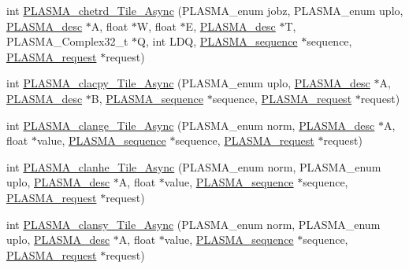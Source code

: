 \begin{DoxyCompactItemize}
\item 
int \hyperlink{group__PLASMA__Complex32__t__Tile__Async_ga4998a0da7c65a0bb81861994c7a3b1bd_ga4998a0da7c65a0bb81861994c7a3b1bd}{P\+L\+A\+S\+M\+A\+\_\+chetrd\+\_\+\+Tile\+\_\+\+Async} (P\+L\+A\+S\+M\+A\+\_\+enum jobz, P\+L\+A\+S\+M\+A\+\_\+enum uplo, \hyperlink{structplasma__desc__t}{P\+L\+A\+S\+M\+A\+\_\+desc} $\ast$A, float $\ast$W, float $\ast$E, \hyperlink{structplasma__desc__t}{P\+L\+A\+S\+M\+A\+\_\+desc} $\ast$T, P\+L\+A\+S\+M\+A\+\_\+\+Complex32\+\_\+t $\ast$Q, int L\+D\+Q, \hyperlink{structplasma__sequence__t}{P\+L\+A\+S\+M\+A\+\_\+sequence} $\ast$sequence, \hyperlink{structplasma__request__t}{P\+L\+A\+S\+M\+A\+\_\+request} $\ast$request)
\item 
int \hyperlink{group__PLASMA__Complex32__t__Tile__Async_ga88e2c85c4e64c2bcfaef5258f434d109_ga88e2c85c4e64c2bcfaef5258f434d109}{P\+L\+A\+S\+M\+A\+\_\+clacpy\+\_\+\+Tile\+\_\+\+Async} (P\+L\+A\+S\+M\+A\+\_\+enum uplo, \hyperlink{structplasma__desc__t}{P\+L\+A\+S\+M\+A\+\_\+desc} $\ast$A, \hyperlink{structplasma__desc__t}{P\+L\+A\+S\+M\+A\+\_\+desc} $\ast$B, \hyperlink{structplasma__sequence__t}{P\+L\+A\+S\+M\+A\+\_\+sequence} $\ast$sequence, \hyperlink{structplasma__request__t}{P\+L\+A\+S\+M\+A\+\_\+request} $\ast$request)
\item 
int \hyperlink{group__PLASMA__Complex32__t__Tile__Async_ga516fb49175da2a62925dd5f4e8570c6c_ga516fb49175da2a62925dd5f4e8570c6c}{P\+L\+A\+S\+M\+A\+\_\+clange\+\_\+\+Tile\+\_\+\+Async} (P\+L\+A\+S\+M\+A\+\_\+enum norm, \hyperlink{structplasma__desc__t}{P\+L\+A\+S\+M\+A\+\_\+desc} $\ast$A, float $\ast$value, \hyperlink{structplasma__sequence__t}{P\+L\+A\+S\+M\+A\+\_\+sequence} $\ast$sequence, \hyperlink{structplasma__request__t}{P\+L\+A\+S\+M\+A\+\_\+request} $\ast$request)
\item 
int \hyperlink{group__PLASMA__Complex32__t__Tile__Async_ga3c2dd7c56fa31d7696b81c19e7f1eacb_ga3c2dd7c56fa31d7696b81c19e7f1eacb}{P\+L\+A\+S\+M\+A\+\_\+clanhe\+\_\+\+Tile\+\_\+\+Async} (P\+L\+A\+S\+M\+A\+\_\+enum norm, P\+L\+A\+S\+M\+A\+\_\+enum uplo, \hyperlink{structplasma__desc__t}{P\+L\+A\+S\+M\+A\+\_\+desc} $\ast$A, float $\ast$value, \hyperlink{structplasma__sequence__t}{P\+L\+A\+S\+M\+A\+\_\+sequence} $\ast$sequence, \hyperlink{structplasma__request__t}{P\+L\+A\+S\+M\+A\+\_\+request} $\ast$request)
\item 
int \hyperlink{group__PLASMA__Complex32__t__Tile__Async_gaf59201f1fdc1816694de9f7f372f656e_gaf59201f1fdc1816694de9f7f372f656e}{P\+L\+A\+S\+M\+A\+\_\+clansy\+\_\+\+Tile\+\_\+\+Async} (P\+L\+A\+S\+M\+A\+\_\+enum norm, P\+L\+A\+S\+M\+A\+\_\+enum uplo, \hyperlink{structplasma__desc__t}{P\+L\+A\+S\+M\+A\+\_\+desc} $\ast$A, float $\ast$value, \hyperlink{structplasma__sequence__t}{P\+L\+A\+S\+M\+A\+\_\+sequence} $\ast$sequence, \hyperlink{structplasma__request__t}{P\+L\+A\+S\+M\+A\+\_\+request} $\ast$request)

\end{DoxyCompactItemize}
